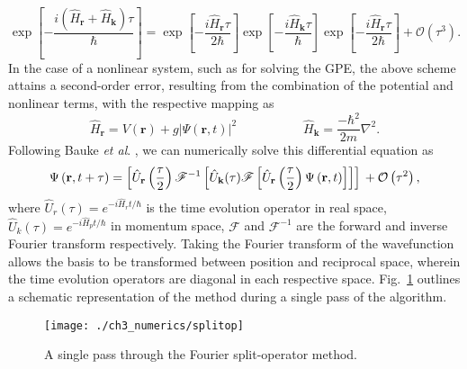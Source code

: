 \begin{equation}\label{eqn:3}
\exp\left[ -\frac{ i\left(\hat{H}_{\textbf{r}} + \hat{H}_{\textbf{k}}\right)\tau}{\hbar} \right] = \exp\left[- \frac{i\hat{H}_{\textbf{r}}\tau}{2\hbar} \right]\exp\left[-\frac{i\hat{H}_{\textbf{k}}\tau}{\hbar}\right]\exp\left[ -\frac{i\hat{H}_{\textbf{r}}\tau}{2\hbar}\right] + \mathcal{O}\left(\tau^3\right).
\end{equation}
In the case of a nonlinear system, such as for solving the GPE, the above scheme attains a second-order error, resulting from the combination of the potential and nonlinear terms, with the respective mapping as \cite{BEC:Javanainen_jphysa_2006}
\begin{equation}
\hat{H}_{\textbf{r}} = V(\mathbf{r}) + g\vert\Psi(\mathbf{r},t)\vert^2\; \hspace{5em} \hat{H}_{\textbf{k}} = \frac{-\hbar^2}{2m}\nabla^2.
\end{equation}
Following Bauke \textit{et al}. \cite{Num:Bauke_cpc_2011}, we can numerically solve this differential equation as
\begin{equation}
\Psi\left(\textbf{r},t+\tau\right) = \left[\hat{U}_{\mathbf{r}}\left(\frac{\tau}{2}\right) \mathscr{F}^{-1} \left[ \hat{U}_{\mathbf{k}}(\tau) \mathscr{F} \left[ \hat{U}_{\mathbf{r}}\left(\frac{\tau}{2}\right) \Psi\left(\mathbf{r},t\right) \right] \right] \right]  \\ + \mathcal{O}\left(\tau^2\right),
\end{equation}
where $\hat{U}_{r}(\tau)=e^{-i\hat{H}_{r}t/\hbar}$ is the time evolution operator in real space, $\hat{U}_{k}(\tau)=e^{-i\hat{H}_{p}t/\hbar}$ in momentum space,  $\mathscr{F}$ and $\mathscr{F}^{-1}$ are the forward and inverse Fourier transform respectively. Taking the Fourier transform of the wavefunction allows the basis to be transformed between position and reciprocal space, wherein the time evolution operators are diagonal in each respective space. Fig.~\ref{fig:num_splitop} outlines a schematic representation of the method during a single pass of the algorithm.

\begin{figure}
    \centering
    \texttt{[image: ./ch3\_numerics/splitop]}
    \caption{A single pass through the Fourier split-operator method.}
    \label{fig:num_splitop}
\end{figure}

